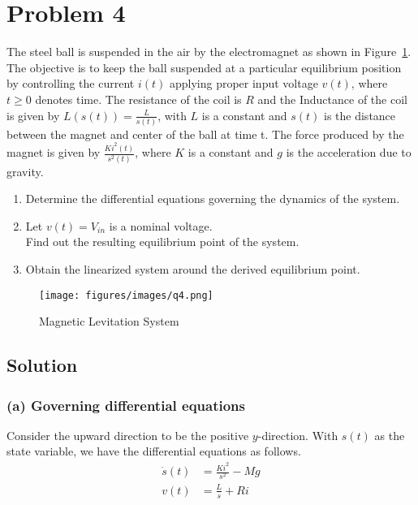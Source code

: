 \section*{Problem 4}

The steel ball is suspended in the air by the electromagnet as shown in Figure~\ref{fig:q4}.
The objective is to keep the ball suspended at a particular equilibrium position by controlling the current \(i(t)\) applying proper input voltage \(v(t)\), where \(t \geq 0\) denotes time.
The resistance of the coil is \(R\) and the Inductance of the coil is given by \(L(s(t)) = \frac{L}{s(t)}\), with \(L\) is a constant and \(s(t)\) is the distance between the magnet and center of the ball at time t.
The force produced by the magnet is given by \(\frac{K i^2(t)}{s^2(t)}\), where \(K\) is a constant and \(g\) is the acceleration due to gravity.

\begin{enumerate}[label= (\alph*)]
    \item Determine the differential equations governing the dynamics of the system.
    \item Let \(v(t) = V_{in}\) is a nominal voltage. \\
          Find out the resulting equilibrium point of the system.
    \item Obtain the linearized system around the derived equilibrium point.
\end{enumerate}

\begin{figure}[h]
    \centering
    \texttt{[image: figures/images/q4.png]}
    \caption{
        Magnetic Levitation System
    }\label{fig:q4}
\end{figure}

\subsection*{Solution}

\subsubsection*{(a) Governing differential equations}

Consider the upward direction to be the positive \(y\)-direction.
With \(s(t)\) as the state variable, we have the differential equations as follows.
\begin{align*}
    \dot s(t) & = \frac{Ki^2}{s^2} - Mg \\
    v(t)      & = \frac{L}{s} + Ri
\end{align*}

